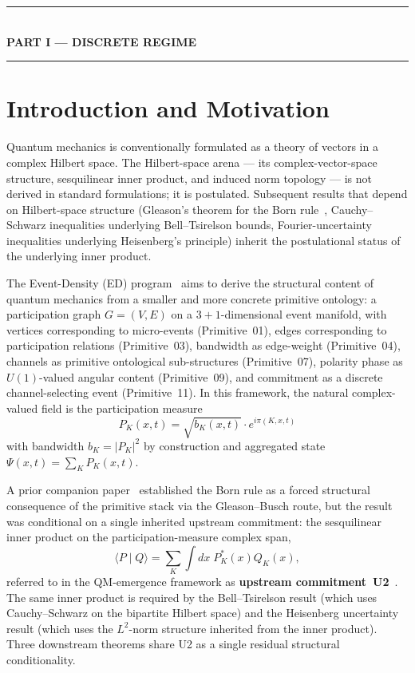 \documentclass[11pt,a4paper]{article}
\begin{document}
\begin{center}
\rule{0.3\linewidth}{0.4pt}\\[0.5em]
{\large\bfseries PART I --- DISCRETE REGIME}\\[0.2em]
\rule{0.3\linewidth}{0.4pt}
\end{center}

\section{Introduction and Motivation}

Quantum mechanics is conventionally formulated as a theory of vectors in a complex Hilbert space. The Hilbert-space arena --- its complex-vector-space structure, sesquilinear inner product, and induced norm topology --- is not derived in standard formulations; it is postulated. Subsequent results that depend on Hilbert-space structure (Gleason's theorem for the Born rule~\cite{gleason}, Cauchy--Schwarz inequalities underlying Bell--Tsirelson bounds, Fourier-uncertainty inequalities underlying Heisenberg's principle) inherit the postulational status of the underlying inner product.

The Event-Density (ED) program~\cite{phase1,arcr,arcq} aims to derive the structural content of quantum mechanics from a smaller and more concrete primitive ontology: a participation graph $G = (V, E)$ on a $3{+}1$-dimensional event manifold, with vertices corresponding to micro-events (Primitive~01), edges corresponding to participation relations (Primitive~03), bandwidth as edge-weight (Primitive~04), channels as primitive ontological sub-structures (Primitive~07), polarity phase as $U(1)$-valued angular content (Primitive~09), and commitment as a discrete channel-selecting event (Primitive~11). In this framework, the natural complex-valued field is the participation measure
\begin{equation}
P_K(x, t) = \sqrt{b_K(x, t)} \cdot e^{i \pi(K, x, t)}
\label{eq:pmeasure}
\end{equation}
with bandwidth $b_K = |P_K|^2$ by construction and aggregated state $\Psi(x, t) = \sum_K P_K(x, t)$.

A prior companion paper~\cite{borngleason} established the Born rule as a forced structural consequence of the primitive stack via the Gleason--Busch route, but the result was conditional on a single inherited upstream commitment: the sesquilinear inner product on the participation-measure complex span,
\begin{equation}
\langle P \mid Q \rangle = \sum_K \int dx \; P_K^*(x) Q_K(x),
\label{eq:innerproduct}
\end{equation}
referred to in the QM-emergence framework as \textbf{upstream commitment~U2}~\cite[\S 4]{phase1}. The same inner product is required by the Bell--Tsirelson result (which uses Cauchy--Schwarz on the bipartite Hilbert space) and the Heisenberg uncertainty result (which uses the $L^2$-norm structure inherited from the inner product). Three downstream theorems share U2 as a single residual structural conditionality.
\end{document}
